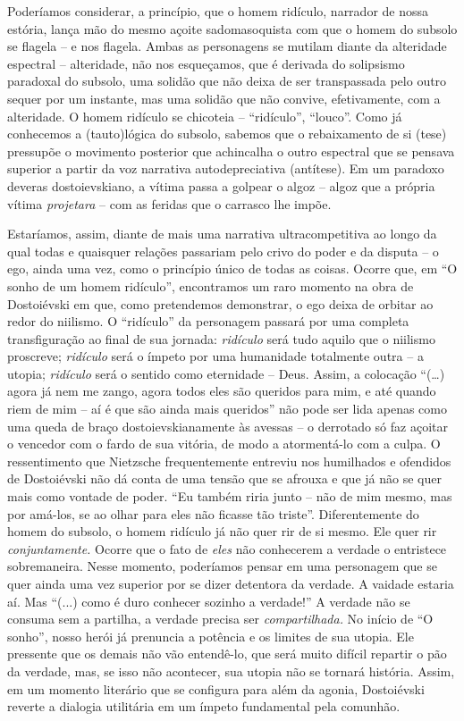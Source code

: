 Poderíamos considerar, a princípio, que o homem ridículo, narrador de
nossa estória, lança mão do mesmo açoite sadomasoquista com que o homem
do subsolo se flagela -- e nos flagela. Ambas as personagens se mutilam
diante da alteridade espectral -- alteridade, não nos esqueçamos, que é
derivada do solipsismo paradoxal do subsolo, uma solidão que não deixa
de ser transpassada pelo outro sequer por um instante, mas uma solidão
que não convive, efetivamente, com a alteridade. O homem ridículo se
chicoteia -- ``ridículo'', ``louco''. Como já conhecemos a (tauto)lógica
do subsolo, sabemos que o rebaixamento de si (tese) pressupõe o
movimento posterior que achincalha o outro espectral que se pensava
superior a partir da voz narrativa autodepreciativa (antítese). Em um
paradoxo deveras dostoievskiano, a vítima passa a golpear o algoz --
algoz que a própria vítima \emph{projetara} -- com as feridas que o
carrasco lhe impõe.

Estaríamos, assim, diante de mais uma narrativa ultracompetitiva ao
longo da qual todas e quaisquer relações passariam pelo crivo do poder e
da disputa -- o ego, ainda uma vez, como o princípio único de todas as
coisas. Ocorre que, em ``O sonho de um homem ridículo'', encontramos um
raro momento na obra de Dostoiévski em que, como pretendemos demonstrar,
o ego deixa de orbitar ao redor do niilismo. O ``ridículo'' da
personagem passará por uma completa transfiguração ao final de sua
jornada: \emph{ridículo} será tudo aquilo que o niilismo proscreve;
\emph{ridículo} será o ímpeto por uma humanidade totalmente outra -- a
utopia; \emph{ridículo} será o sentido como eternidade -- Deus. Assim, a
colocação ``(\ldots{}) agora já nem me zango, agora todos eles são
queridos para mim, e até quando riem de mim -- aí é que são ainda mais
queridos'' não pode ser lida apenas como uma queda de braço
dostoievskianamente às avessas -- o derrotado só faz açoitar o vencedor
com o fardo de sua vitória, de modo a atormentá-lo com a culpa. O
ressentimento que Nietzsche frequentemente entreviu nos humilhados e
ofendidos de Dostoiévski não dá conta de uma tensão que se afrouxa e que
já não se quer mais como vontade de poder. ``Eu também riria junto --
não de mim mesmo, mas por amá-los, se ao olhar para eles não ficasse tão
triste''. Diferentemente do homem do subsolo, o homem ridículo já não
quer rir de si mesmo. Ele quer rir \emph{conjuntamente.} Ocorre que o
fato de \emph{eles} não conhecerem a verdade o entristece sobremaneira.
Nesse momento, poderíamos pensar em uma personagem que se quer ainda uma
vez superior por se dizer detentora da verdade. A vaidade estaria aí.
Mas ``(...) como é duro conhecer sozinho a verdade!'' A verdade não se
consuma sem a partilha, a verdade precisa ser \emph{compartilhada.} No
início de ``O sonho'', nosso herói já prenuncia a potência e os limites
de sua utopia. Ele pressente que os demais não vão entendê-lo, que será
muito difícil repartir o pão da verdade, mas, se isso não acontecer, sua
utopia não se tornará história. Assim, em um momento literário que se
configura para além da agonia, Dostoiévski reverte a dialogia utilitária
em um ímpeto fundamental pela comunhão.

